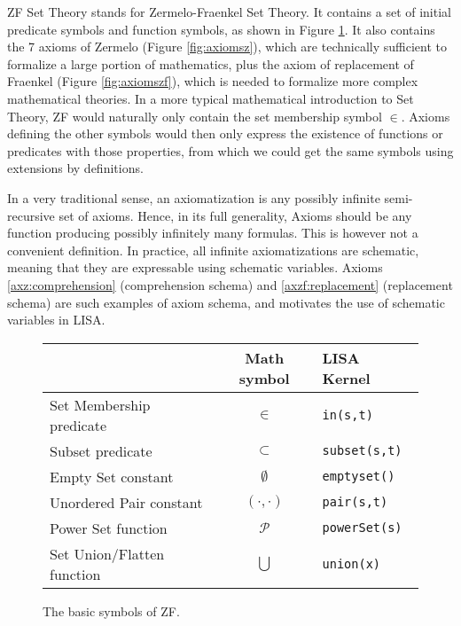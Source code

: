 ZF Set Theory stands for Zermelo-Fraenkel Set Theory. It contains a set of initial predicate symbols and function symbols, as shown in Figure \ref{fig:symbolszf}. It also contains the 7 axioms of Zermelo (Figure \ref{fig:axiomsz}), which are technically sufficient to formalize a large portion of mathematics, plus the axiom of replacement of Fraenkel (Figure \ref{fig:axiomszf}), which is needed to formalize more complex mathematical theories.
In a more typical mathematical introduction to Set Theory, ZF would naturally only contain the set membership symbol $\in$. Axioms defining the other symbols would then only express the existence of functions or predicates with those properties, from which we could get the same symbols using extensions by definitions.

In a very traditional sense, an axiomatization is any possibly infinite semi-recursive set of axioms. Hence, in its full generality, Axioms should be any function producing possibly infinitely many formulas.
This is however not a convenient definition. In practice, all infinite axiomatizations are schematic, meaning that they are expressable using schematic variables. Axioms \ref{axz:comprehension} (comprehension schema) and \ref{axzf:replacement} (replacement schema) are such examples of axiom schema, and motivates the use of schematic variables in LISA.



\begin{figure}
  \begin{center}
    \begin{tabular}{l|c|l}
      {}                         & Math symbol       & LISA Kernel             \\ \hline
      Set Membership predicate   & $\in$             & \lstinline$in(s,t)$     \\
      Subset predicate           & $\subset$         & \lstinline$subset(s,t)$ \\
      Empty Set constant         & $\emptyset$       & \lstinline$emptyset()$  \\
      Unordered Pair constant    & $(\cdot, \cdot )$ & \lstinline$pair(s,t)$   \\
      Power Set function         & $\mathcal P$      & \lstinline$powerSet(s)$ \\
      Set Union/Flatten function & $\bigcup$         & \lstinline$union(x)$    \\
    \end{tabular}

    \caption{The basic symbols of ZF.}
    \label{fig:symbolszf}
  \end{center}
\end{figure}

